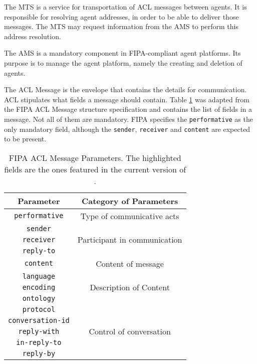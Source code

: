 The \gls{MTS} is a service for transportation of ACL messages between agents. It is responsible for resolving agent addresses, in order to be able to deliver those messages. The MTS may request information from the AMS to perform this address resolution.

The AMS is a mandatory component in FIPA-compliant agent platforms. Its purpose is to manage the agent platform, namely the creating and deletion of agents.

The ACL Message is the envelope that contains the details for communication. \gls{ACL} stipulates what fields a message should contain. Table \ref{tab:fipaACLMessage} was adapted from the FIPA ACL Message structure specification and contains the list of fields in a message. Not all of them are mandatory. FIPA specifies the \texttt{performative} as the only mandatory field, although the \texttt{sender}, \texttt{receiver} and \texttt{content} are expected to be present.

\begin{table}
	\normalsize
	\caption{FIPA ACL Message Parameters. The highlighted fields are the ones featured in the current version of \apiname{}.}
	\label{tab:fipaACLMessage}
	\begin{center}
		\begin{tabular}{c|c}
		\hline
		\textbf{Parameter} & \textbf{Category of Parameters} \\
		\hline
		\colorbox{Apricot}{\texttt{performative}} & Type of communicative acts \\
		\hline
		\colorbox{Apricot}{\texttt{sender}} & \multirow{3}{*}{Participant in communication} \\
		\cline{1-1}
		\colorbox{Apricot}{\texttt{receiver}} \\
		\cline{1-1}
		\texttt{reply-to}  \\
		\hline
		\colorbox{Apricot}{\texttt{content}} & Content of message \\
		\hline
		\texttt{language} & \multirow{3}{*}{Description of Content} \\
		\cline{1-1}
		\texttt{encoding} \\
		\cline{1-1}
		\colorbox{Apricot}{\texttt{ontology}} \\
		\hline
		\colorbox{Apricot}{\texttt{protocol}} & \multirow{5}{*}{Control of conversation} \\
		\cline{1-1}
		\colorbox{Apricot}{\texttt{conversation-id}} \\
		\cline{1-1}
		\texttt{reply-with} \\
		\cline{1-1}
		\texttt{in-reply-to} \\
		\cline{1-1}
		\colorbox{Apricot}{\texttt{reply-by}} \\
		\hline
		\end{tabular}
	\end{center}
\end{table} 

